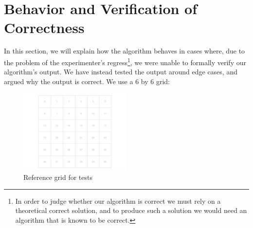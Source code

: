 \section{Behavior and Verification of Correctness}
In this section, we will explain how the algorithm behaves in cases where, due to the problem of the experimenter's regress\footnote{In order to judge whether our algorithm is correct we must rely on a theoretical correct solution, and to produce such a solution we would need an algorithm that is known to be correct.}, we were unable to formally verify our algorithm's output. We have instead tested the output around edge cases, and argued why the output is correct. We use a 6 by 6 grid:
\begin{figure}[H]
    \centering
    \caption{Reference grid for tests}
    \label{gridTest}
    \includegraphics[width=0.5\textwidth]{figures/test_grid.png}
\end{figure}

